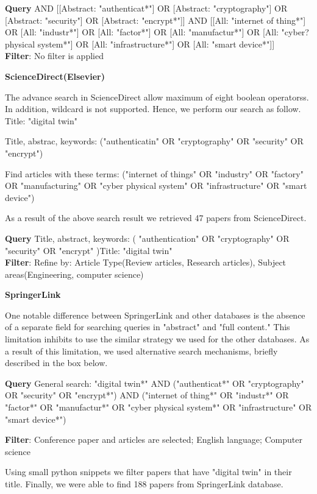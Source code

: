 \begin{tcolorbox}[colback=black!5!white, sharp corners=all, colframe=white!95!black]
\textbf{Query}
 AND [[Abstract: "authenticat*"] OR [Abstract: "cryptography"] OR [Abstract: "security"] OR [Abstract: "encrypt*"]] AND [[All: "internet of thing*"] OR [All: "industr*"] OR [All: "factor*"] OR [All: "manufactur*"] OR [All: "cyber?physical system*"] OR [All: "infrastructure*"] OR [All: "smart device*"]]\\

\textbf{Filter}: No filter is applied

\end{tcolorbox}


\textbf{ScienceDirect(Elsevier)}

The advance search in ScienceDirect allow maximum of eight boolean operatorss. In addition, wildcard is not supported. Hence, we perform our search as follow. 
Title: "digital twin"

Title, abstrac, keywords: ("authenticatin" OR "cryptography" OR "security" OR "encrypt")

Find articles with these terms: ("internet of things" OR "industry" OR "factory" OR "manufacturing" OR "cyber physical system" OR "infrastructure" OR "smart device")

As a result of the above search result we retrieved 47 papers from ScienceDirect. 

\begin{tcolorbox}[colback=black!5!white, sharp corners=all, colframe=white!95!black]
\textbf{Query}
\tcblower
Title, abstract, keywords: ( "authentication" OR "cryptography" OR "security" OR "encrypt" )Title: "digital twin"\\

\textbf{Filter}: Refine by: Article Type(Review articles, Research articles), Subject areas(Engineering, computer science) 

\end{tcolorbox}


\textbf{SpringerLink}

One notable difference between SpringerLink and other databases is the absence of a separate field for searching queries in "abstract" and "full content." This limitation inhibits to use the similar strategy we used for the other databases. 
As a result of this limitation, we used alternative search mechanisms, briefly described in the  box below.

\begin{tcolorbox}[colback=black!5!white, sharp corners=all, colframe=white!95!black]
\textbf{Query}
General search: "digital twin*" AND ("authenticat*" OR "cryptography" OR "security" OR "encrypt*") AND ("internet of thing*" OR "industr*" OR "factor*" OR "manufactur*" OR "cyber physical system*" OR "infrastructure" OR "smart device*") 

\tcblower
\textbf{Filter}: Conference paper and articles are selected; English language; Computer science

Using small python snippets we filter papers that have "digital twin" in their title. Finally, we were able to find 188 papers from SpringerLink database. 

\end{tcolorbox}
